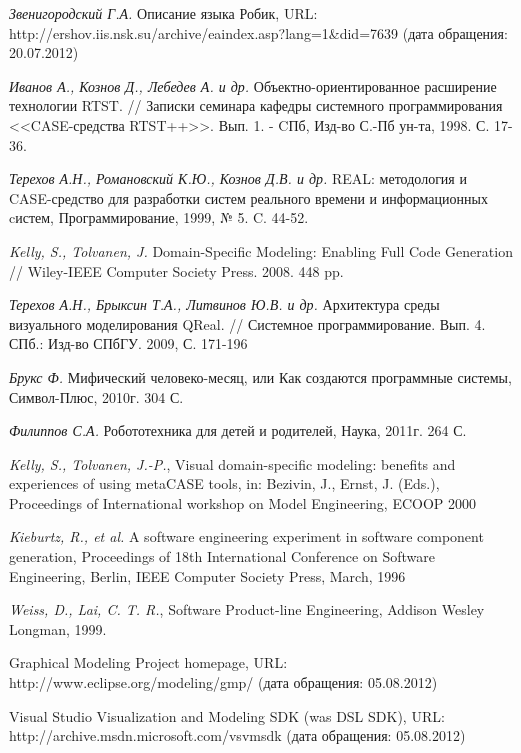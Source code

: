 \documentclass[a4paper]{article}
\begin{document}
\begin{thebibliography}{9001}
   \emph{Звенигородский Г.А.} Описание языка Робик, URL: http://ershov.iis.nsk.su/archive/eaindex.asp?lang=1\&did=7639 (дата обращения: 20.07.2012)
  
   \emph{Иванов А., Кознов Д., Лебедев А. и др.} Объектно-ориентированное расширение технологии RTST. // Записки семинара кафедры системного программирования <<CASE-средства RTST++>>. Вып. 1. - CПб, Изд-во С.-Пб ун-та, 1998. С. 17-36.
  
   \emph{Терехов А.Н., Романовский К.Ю., Кознов Д.В. и др.} REAL: методология и CASE-средство для разработки систем реального времени и информационных cистем, Программирование, 1999, № 5. C. 44-52.

   \emph{Kelly, S., Tolvanen, J.} Domain-Specific Modeling: Enabling Full Code Generation // Wiley-IEEE Computer Society Press. 2008. 448 pp.

   \emph{Терехов А.Н., Брыксин Т.А., Литвинов Ю.В. и др.} Архитектура среды визуального моделирования QReal. // Системное программирование. Вып. 4. СПб.: Изд-во СПбГУ. 2009, С. 171-196
  
   \emph{Брукс Ф.} Мифический человеко-месяц, или Как создаются программные системы, Символ-Плюс, 2010г. 304 С.
  
   \emph{Филиппов С.А.} Робототехника для детей и родителей, Наука, 2011г. 264 С.
  
   \emph{Kelly, S., Tolvanen, J.-P.}, Visual domain-specific modeling: benefits and experiences of using metaCASE tools, in: Bezivin, J., Ernst, J. (Eds.), Proceedings of International workshop on Model Engineering, ECOOP 2000
  
   \emph{Kieburtz, R., et al.} A software engineering experiment in software component generation, Proceedings of 18th International Conference on Software Engineering, Berlin, IEEE Computer Society Press, March, 1996

   \emph{Weiss, D., Lai, C. T. R.}, Software Product-line Engineering, Addison Wesley Longman, 1999.
  
   Graphical Modeling Project homepage, URL: http://www.eclipse.org/modeling/gmp/ (дата обращения: 05.08.2012)
  
   Visual Studio Visualization and Modeling SDK (was DSL SDK), URL: http://archive.msdn.microsoft.com/vsvmsdk (дата обращения: 05.08.2012)
  

\end{thebibliography}
\end{document}

